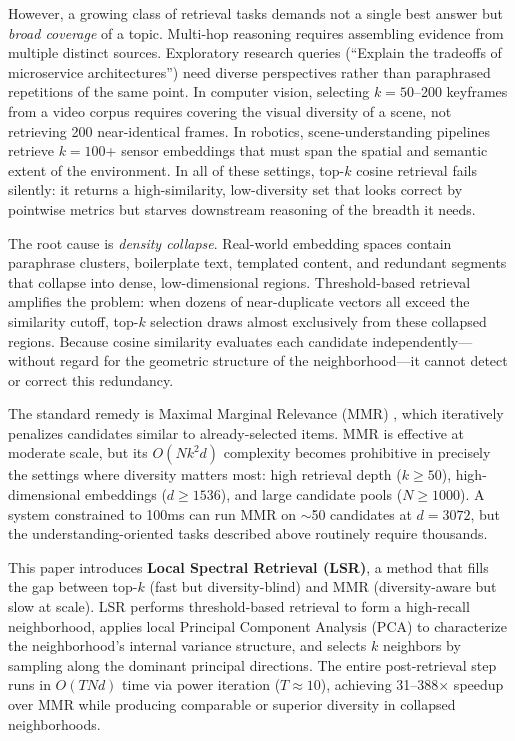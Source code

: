 \documentclass{article}
\begin{document}
However, a growing class of retrieval tasks demands not a single best answer but \emph{broad coverage} of a topic. Multi-hop reasoning requires assembling evidence from multiple distinct sources. Exploratory research queries (``Explain the tradeoffs of microservice architectures'') need diverse perspectives rather than paraphrased repetitions of the same point. In computer vision, selecting $k = 50$--200 keyframes from a video corpus requires covering the visual diversity of a scene, not retrieving 200 near-identical frames. In robotics, scene-understanding pipelines retrieve $k = 100$+ sensor embeddings that must span the spatial and semantic extent of the environment. In all of these settings, top-$k$ cosine retrieval fails silently: it returns a high-similarity, low-diversity set that looks correct by pointwise metrics but starves downstream reasoning of the breadth it needs.

The root cause is \emph{density collapse}. Real-world embedding spaces contain paraphrase clusters, boilerplate text, templated content, and redundant segments that collapse into dense, low-dimensional regions. Threshold-based retrieval amplifies the problem: when dozens of near-duplicate vectors all exceed the similarity cutoff, top-$k$ selection draws almost exclusively from these collapsed regions. Because cosine similarity evaluates each candidate independently---without regard for the geometric structure of the neighborhood---it cannot detect or correct this redundancy.

The standard remedy is Maximal Marginal Relevance (MMR) \cite{carbonell1998mmr}, which iteratively penalizes candidates similar to already-selected items. MMR is effective at moderate scale, but its $O(Nk^2 d)$ complexity becomes prohibitive in precisely the settings where diversity matters most: high retrieval depth ($k \geq 50$), high-dimensional embeddings ($d \geq 1536$), and large candidate pools ($N \geq 1000$). A system constrained to 100ms can run MMR on $\sim$50 candidates at $d = 3072$, but the understanding-oriented tasks described above routinely require thousands.

This paper introduces \textbf{Local Spectral Retrieval (LSR)}, a method that fills the gap between top-$k$ (fast but diversity-blind) and MMR (diversity-aware but slow at scale). LSR performs threshold-based retrieval to form a high-recall neighborhood, applies local Principal Component Analysis (PCA) to characterize the neighborhood's internal variance structure, and selects $k$ neighbors by sampling along the dominant principal directions. The entire post-retrieval step runs in $O(TNd)$ time via power iteration ($T \approx 10$), achieving 31--388$\times$ speedup over MMR while producing comparable or superior diversity in collapsed neighborhoods.
\end{document}
